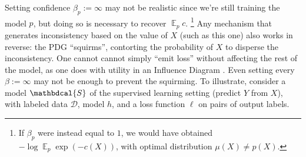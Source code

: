 \documentclass[twoside]{article}
\theoremstyle{plain}
\theoremstyle{definition}
\DeclareMathOperator*{\Ex}{\mathbb{E}} %
\newcommand{\dg}[1]{\mathbdcal{#1}}
\begin{document}
Setting confidence $\beta_p := \infty$ may not be realistic since
we're still training the model $p$,
but doing so is necessary to recover $\Ex_p c$.%
\footnote{If $\beta_p$ were instead equal to $1$, we would have obtained $-\log \Ex_p \exp(-c(\!X\!))$, with optimal distribution $\mu(\!X\!) \!\ne\! p(\!X\!)$.\label{fn:logEexp}}
Any mechanism that generates inconsistency based on the value of $X$ (such as this one) also works in reverse:
the PDG ``squirms'', contorting the probability of $X$ to disperse the inconsistency.
One cannot cannot simply ``emit loss''
without affecting the rest of the model,
as one does
with utility
in an Influence Diagram \parencite{influencediagrams}.
%
%
Even setting every $\beta := \infty$ may not be enough to prevent the squirming.
\def\mypdg{\dg{S}}
To illustrate, consider a model $\mypdg$ of the supervised learning setting (predict $Y$ from $X$), with labeled data $\mathcal D$, model $h$, and a loss function $\ell$ on pairs of output labels.
\end{document}
